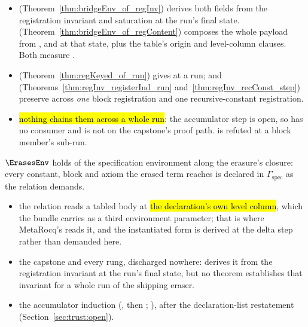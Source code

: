 \begin{itemize}
\item {}  (Theorem~\ref{thm:bridgeEnv_of_regInv})
derives both fields from the registration invariant  and saturation at the
run's final state.  (Theorem~\ref{thm:bridgeEnv_of_regContent}) composes the whole payload from ,
 and  at that state, plus the table's origin and
level-column clauses. Both measure .
\item {}  (Theorem~\ref{thm:regKeyed_of_run}) gives
 at a run;  and 
(Theorems~\ref{thm:regInv_registerInd_run} and~\ref{thm:regInv_recConst_step}) preserve
 across \emph{one} block registration and one recursive-constant registration.
\item {} \hl{nothing chains them across a whole run}: the accumulator step
 is open, so  has no consumer and is not on the
capstone's proof path.  is refuted at a block member's sub-run.
\end{itemize}

\begin{assumption}
\label{asm:ErasureBridge-erasesEnv}
\leanok
{}
\stOpen{}  $\ErasesEnv$ holds of the specification environment along the erasure's
closure: every constant, block and axiom the erased term reaches is declared in
$\Gamma_{\mathrm{spec}}$ as the relation demands.
\begin{itemize}
\item {} the relation reads a tabled body at \hl{the declaration's own level column},
which the bundle carries as a third environment parameter; that is where MetaRocq's
 reads it, and the instantiated form is derived at the delta step
rather than demanded here.
\item {} the capstone and every rung, discharged nowhere:
 derives it from the registration invariant at the run's final
state, but no theorem establishes that invariant for a whole run of the shipping eraser.
\item {} the accumulator induction (, then
; ), after the declaration-list
restatement (Section~\ref{sec:trust:open}).
\end{itemize}
\end{assumption}

